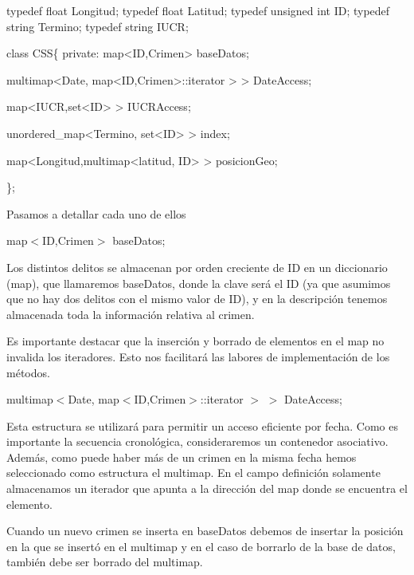 \begin{DoxyCode}
\textcolor{keyword}{typedef} \textcolor{keywordtype}{float} Longitud;
\textcolor{keyword}{typedef} \textcolor{keywordtype}{float} Latitud;
\textcolor{keyword}{typedef} \textcolor{keywordtype}{unsigned} \textcolor{keywordtype}{int} ID;
\textcolor{keyword}{typedef} \textcolor{keywordtype}{string} Termino;
\textcolor{keyword}{typedef} \textcolor{keywordtype}{string} IUCR;

\textcolor{keyword}{class }CSS\{
\textcolor{keyword}{private}:
    map<ID,Crimen> baseDatos; 

    multimap<Date, map<ID,Crimen>::iterator > > DateAccess;

    map<IUCR,set<ID> > IUCRAccess;

    unordered\_map<Termino, set<ID> > index;
    
    map<Longitud,multimap<latitud, ID> > posicionGeo;

\};
\end{DoxyCode}


Pasamos a detallar cada uno de ellos

\begin{DoxyItemize}
\item map$<$\+I\+D,\+Crimen$>$ base\+Datos;\end{DoxyItemize}
Los distintos delitos se almacenan por orden creciente de I\+D en un diccionario (map), que llamaremos base\+Datos, donde la clave será el I\+D (ya que asumimos que no hay dos delitos con el mismo valor de I\+D), y en la descripción tenemos almacenada toda la información relativa al crimen.

Es importante destacar que la inserción y borrado de elementos en el map no invalida los iteradores. Esto nos facilitará las labores de implementación de los métodos.

\begin{DoxyItemize}
\item multimap$<$Date, map$<$\+I\+D,\+Crimen$>$\+::iterator $>$ $>$ Date\+Access;\end{DoxyItemize}
Esta estructura se utilizará para permitir un acceso eficiente por fecha. Como es importante la secuencia cronológica, consideraremos un contenedor asociativo. Además, como puede haber más de un crimen en la misma fecha hemos seleccionado como estructura el multimap. En el campo definición solamente almacenamos un iterador que apunta a la dirección del map donde se encuentra el elemento.

Cuando un nuevo crimen se inserta en base\+Datos debemos de insertar la posición en la que se insertó en el multimap y en el caso de borrarlo de la base de datos, también debe ser borrado del multimap.

